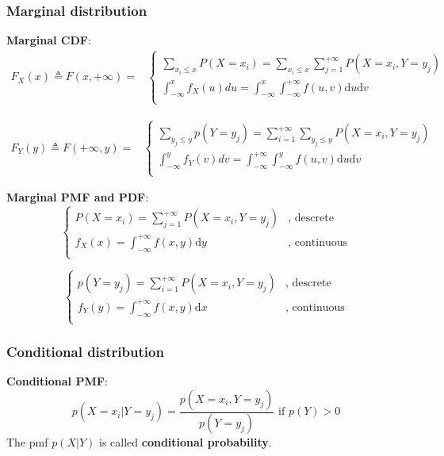 \subsubsection{Marginal distribution}
\textbf{Marginal CDF}:
\begin{equation}\begin{split}
F_X(x) \triangleq F(x,+\infty)= 
& \begin{cases}
\sum\limits_{x_i \leq x}P(X=x_i)=\sum\limits_{x_i \leq x}\sum\limits_{j=1}^{+\infty}P(X=x_i,Y=y_j) \\
\int_{-\infty}^{x}f_X(u)du=\int_{-\infty}^{x}\int_{-\infty}^{+\infty} f(u,v)\mathrm{d}u\mathrm{d}v \\
\end{cases}
\end{split}\end{equation}

\begin{equation}\begin{split}
F_Y(y) \triangleq F(+\infty,y)= 
& \begin{cases}
\sum\limits_{y_j \leq y}p(Y=y_j)=\sum\limits_{i=1}^{+\infty}\sum_{y_j \leq y}P(X=x_i,Y=y_j) \\
\int_{-\infty}^{y}f_Y(v)dv=\int_{-\infty}^{+\infty}\int_{-\infty}^{y} f(u,v)\mathrm{d}u\mathrm{d}v \\
\end{cases}
\end{split}\end{equation}

\textbf{Marginal PMF and PDF}:
\begin{equation} \begin{cases}
P(X=x_i)=\sum_{j=1}^{+\infty}P(X=x_i,Y=y_j) & \text{, descrete}\\
f_X(x)=\int_{-\infty}^{+\infty} f(x,y)\mathrm{d}y & \text{, continuous}\\
\end{cases}\end{equation}

\begin{equation}\begin{cases}
p(Y=y_j)=\sum_{i=1}^{+\infty}P(X=x_i,Y=y_j) & \text{, descrete}\\
f_Y(y)=\int_{-\infty}^{+\infty} f(x,y)\mathrm{d}x & \text{, continuous}\\
\end{cases}\end{equation}


\subsubsection{Conditional distribution}
\textbf{Conditional PMF}:
\begin{equation}
p(X=x_i|Y=y_j)=\dfrac{p(X=x_i,Y=y_j)}{p(Y=y_j)} \text{ if } p(Y)>0
\end{equation}
The pmf $p(X|Y)$ is called \textbf{conditional probability}.

